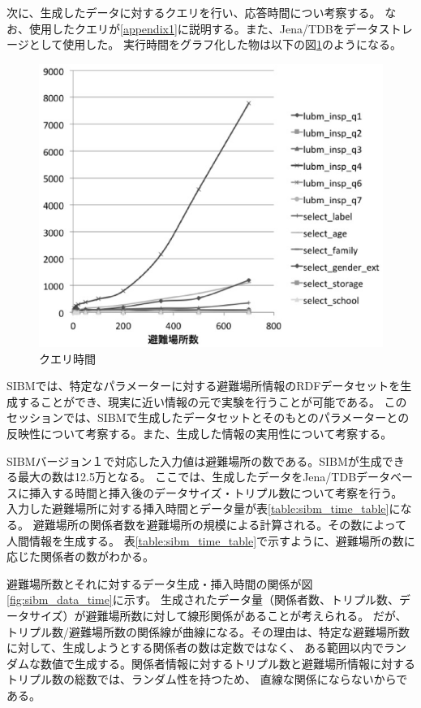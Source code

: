 次に、生成したデータに対するクエリを行い、応答時間につい考察する。
なお、使用したクエリが\ref{appendix1}に説明する。また、Jena/TDBをデータストレージとして使用した。
実行時間をグラフ化した物は以下の図\ref{fig:sibm_query_time}のようになる。

\begin{figure}[t!]
 	\begin{center}
 		\includegraphics[width=120mm]{./images/test_query1.eps}
 		\caption{クエリ時間}
 		\label{fig:sibm_query_time}
 	\end{center}
\end{figure}

SIBMでは、特定なパラメーターに対する避難場所情報のRDFデータセットを生成することができ、現実に近い情報の元で実験を行うことが可能である。
このセッションでは、SIBMで生成したデータセットとそのもとのパラメーターとの反映性について考察する。また、生成した情報の実用性について考察する。

SIBMバージョン１で対応した入力値は避難場所の数である。SIBMが生成できる最大の数は12.5万となる。
ここでは、生成したデータをJena/TDBデータベースに挿入する時間と挿入後のデータサイズ・トリプル数について考察を行う。
入力した避難場所に対する挿入時間とデータ量が表\ref{table:sibm_time_table}になる。
避難場所の関係者数を避難場所の規模による計算される。その数によって人間情報を生成する。
表\ref{table:sibm_time_table}で示すように、避難場所の数に応じた関係者の数がわかる。

避難場所数とそれに対するデータ生成・挿入時間の関係が図\ref{fig:sibm_data_time}に示す。
生成されたデータ量（関係者数、トリプル数、データサイズ）が避難場所数に対して線形関係があることが考えられる。
だが、トリプル数/避難場所数の関係線が曲線になる。その理由は、特定な避難場所数に対して、生成しようとする関係者の数は定数ではなく、
ある範囲以内でランダムな数値で生成する。関係者情報に対するトリプル数と避難場所情報に対するトリプル数の総数では、ランダム性を持つため、
直線な関係にならないからである。

